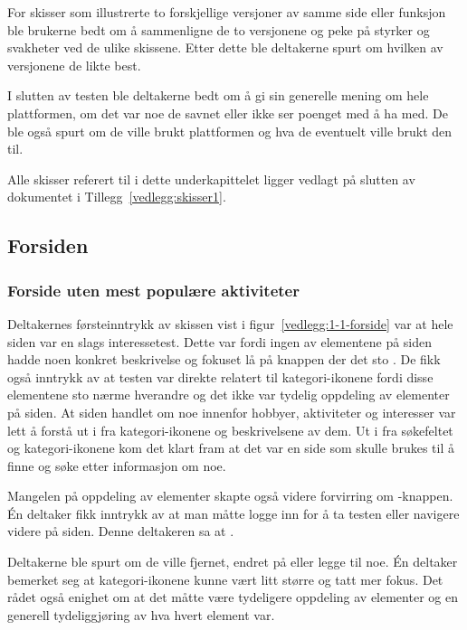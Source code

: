 For skisser som illustrerte to forskjellige versjoner av samme side eller funksjon ble brukerne bedt om å sammenligne de to versjonene og peke på styrker og svakheter ved de ulike skissene. Etter dette ble deltakerne spurt om hvilken av versjonene de likte best.

I slutten av testen ble deltakerne bedt om å gi sin generelle mening om hele plattformen, om det var noe de savnet eller ikke ser poenget med å ha med. De ble også spurt om de ville brukt plattformen og hva de eventuelt ville brukt den til.

Alle skisser referert til i dette underkapittelet ligger vedlagt på slutten av dokumentet i Tillegg~\ref{vedlegg:skisser1}.

\subsection{Forsiden}

\subsubsection{Forside uten mest populære aktiviteter}
Deltakernes førsteinntrykk av skissen vist i figur~\ref{vedlegg:1-1-forside} var at hele siden var en slags interessetest. Dette var fordi ingen av elementene på siden hadde noen konkret beskrivelse og fokuset lå på knappen der det sto . De fikk også inntrykk av at testen var direkte relatert til kategori-ikonene fordi disse elementene sto nærme hverandre og det ikke var tydelig oppdeling av elementer på siden. At siden handlet om noe innenfor hobbyer, aktiviteter og interesser var lett å forstå ut i fra kategori-ikonene og beskrivelsene av dem. Ut i fra søkefeltet og kategori-ikonene kom det klart fram at det var en side som skulle brukes til å finne og søke etter informasjon om noe. 

Mangelen på oppdeling av elementer skapte også videre forvirring om -knappen. Én deltaker fikk inntrykk av at man måtte logge inn for å ta testen eller navigere videre på siden. Denne deltakeren sa at .

Deltakerne ble spurt om de ville fjernet, endret på eller legge til noe. Én deltaker bemerket seg at kategori-ikonene kunne vært litt større og tatt mer fokus. Det rådet også enighet om at det måtte være tydeligere oppdeling av elementer og en generell tydeliggjøring av hva hvert element var.

